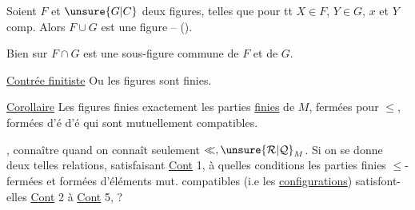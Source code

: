 
  Soient $F$ et $\unsure{G|C}$ deux figures, telles que pour tt \deleted{$\forall$}$X\in F$, $Y\in G$, $x$ et $Y$ comp.
Alors $F\cup G$ est une figure --  ().

Bien sur $F\cap G$ est une sous-figure commune de $F$ et de $G$.


\uline{Contrée finitiste} Ou les figures sont finies.  

\uline{Corollaire}  Les figures finies  exactement les parties \uline{finies} de $M$, fermées pour $\leq$, formées d'é  d'é  qui sont mutuellement compatibles.

,      connaître quand on connaît seulement $\ll,\unsure{\mathcal R|\mathcal Q}_{M}$. 
Si on se donne deux telles relations,  satisfaisant \uline{Cont} 1, à quelles conditions les parties finies $\leq$-fermées  et formées d'éléments mut. compatibles (i.e les \uline{configurations}) satisfont-elles \uline{Cont} 2 à \uline{Cont} 5, ?
